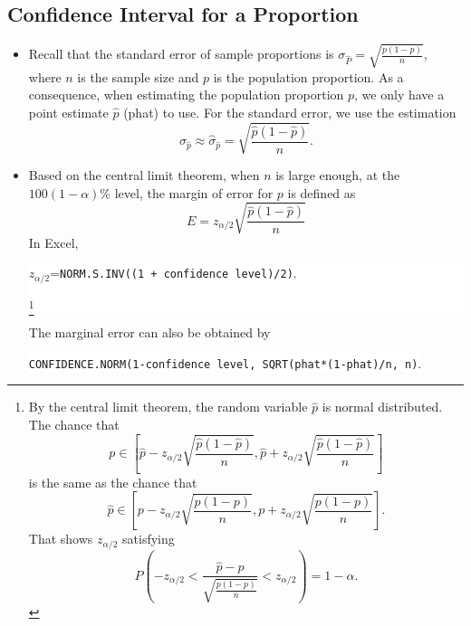 
\hypertarget{confidence-interval-for-a-proportion}{%
\subsection{Confidence Interval for a
Proportion}}

\begin{itemize}
\item
  Recall that the standard error of sample proportions is
  \(\sigma_{\hat{P}}=\sqrt{\frac{p(1-p)}{n}}\), where \(n\) is the
  sample size and \(p\) is the population proportion. As a consequence,
  when estimating the population proportion \(p\), we only have a point
  estimate \(\hat{p}\) (phat) to use. For the standard error, we use the
  estimation
  \[\sigma_{\hat{p}}\approx\hat{\sigma}_{\hat{p}}=\sqrt{\dfrac{\hat{p}(1-\hat{p})}{n}}.\]

\item
  Based on the central limit theorem, when \(n\) is large enough, at the
  \(100(1-\alpha)\%\) level, the margin of error for \(p\) is defined as
  \[E=z_{\alpha/2}\sqrt{\frac{\hat{p}(1-\hat{p})}{n}}\]
  In Excel,\\
  \begin{fullwidth}\raggedleft
    \colorbox{white}{
      \(z_{\alpha/2}\)=\texttt{NORM.S.INV((1\ +\ confidence\ level)/2)}.
  
      \footnote{\footnotesize
        By the central limit theorem, the random variable \(\hat{p}\) is
      normal distributed. The chance that
      \[p\in \left[\hat{p}-z_{\alpha/2}\sqrt{\frac{\hat{p}(1-\hat{p})}{n}}, \hat{p}+z_{\alpha/2}\sqrt{\frac{\hat{p}(1-\hat{p})}{n}}\right]\]
      is the same as the chance that
      \[\hat{p}\in \left[p-z_{\alpha/2}\sqrt{\frac{p(1-p)}{n}}, p+z_{\alpha/2}\sqrt{\frac{p(1-p)}{n}}\right].\]
      That shows \(z_{\alpha/2}\) satisfying
      \[P(-z_{\alpha/2}<\dfrac{\hat{p}-p}{\sqrt{\frac{p(1-p)}{n}}}<z_{\alpha/2})=1-\alpha.\]
      }
    }
  \end{fullwidth}

  The marginal error can also be obtained by

  \begin{fullwidth}
    \colorbox{white}{
      \texttt{CONFIDENCE.NORM(1-confidence\ level,\ SQRT(phat*(1-phat)/n,\ n)}.
    }
  \end{fullwidth}


\end{itemize}
